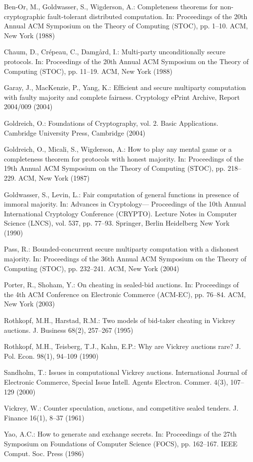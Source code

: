\documentclass[letterpaper,11pt]{article}
\begin{document}
\begin{thebibliography}{15}
	 Ben-Or, M., Goldwasser, S., Wigderson, A.: Completeness theorems for non-cryptographic fault-tolerant
	distributed computation. In: Proceedings of the 20th Annual ACM Symposium on the Theory of Computing (STOC), pp. 1–10. ACM, New York (1988)

 	 Chaum, D., Crépeau, C., Damgård, I.: Multi-party unconditionally secure protocols. In: Proceedings of the 20th Annual ACM
	Symposium on the Theory of Computing (STOC), pp. 11–19. ACM, New York (1988)

 	 Garay, J., MacKenzie, P., Yang, K.: Efﬁcient and secure multiparty computation with faulty majority and complete fairness.
	Cryptology ePrint Archive, Report 2004/009 (2004)

 	 Goldreich, O.: Foundations of Cryptography, vol. 2. Basic Applications. Cambridge University Press, Cambridge (2004)

 	 Goldreich, O., Micali, S., Wigderson, A.: How to play any mental game or a completeness theorem for protocols with honest
	majority. In: Proceedings of the 19th Annual ACM Symposium on the Theory of Computing (STOC), pp. 218–229. ACM, New York (1987)

 	 Goldwasser, S., Levin, L.: Fair computation of general functions in presence of immoral majority. In: Advances in Cryptology—
	Proceedings of the 10th Annual International Cryptology Conference (CRYPTO). Lecture Notes in Computer Science (LNCS), vol. 537, pp. 77–93.
	Springer, Berlin Heidelberg New York (1990)

 	 Pass, R.: Bounded-concurrent secure multiparty computation with a dishonest majority. In: Proceedings of the 36th Annual ACM
	Symposium on the Theory of Computing (STOC), pp. 232–241. ACM, New York (2004)

 	 Porter, R., Shoham, Y.: On cheating in sealed-bid auctions. In: Proceedings of the 4th ACM Conference on Electronic Commerce
	(ACM-EC), pp. 76–84. ACM, New York (2003)

 	 Rothkopf, M.H., Harstad, R.M.: Two models of bid-taker cheating in Vickrey auctions. J. Business 68(2), 257–267 (1995)

	 Rothkopf, M.H., Teisberg, T.J., Kahn, E.P.: Why are Vickrey auctions rare? J. Pol. Econ. 98(1), 94–109 (1990)
	
	 Sandholm, T.: Issues in computational Vickrey auctions. International Journal of Electronic Commerce, Special Issue Intell. Agents Electron. Commer. 4(3), 107–129 (2000)
	
	 Vickrey, W.: Counter speculation, auctions, and competitive sealed tenders. J. Finance 16(1), 8–37 (1961)
	
	 Yao, A.C.: How to generate and exchange secrets. In: Proceedings of the 27th Symposium on Foundations of Computer Science (FOCS), pp. 162–167. IEEE Comput. Soc. Press (1986)
\end{thebibliography}
\end{document}
